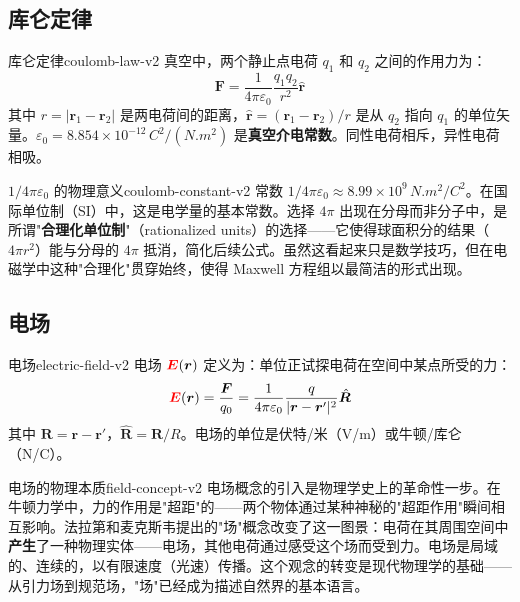 \documentclass[11pt,a4paper,openany,oneside]{book}
\newcommand{\vecE}{\textcolor{red}{\vect{E}}}
\newcommand{\eps}{\varepsilon}
\newcommand{\vect}[1]{\bm{#1}}
\newcommand{\unitvec}[1]{\hat{\vect{#1}}}
\begin{document}
\subsection{库仑定律}

\begin{theorem}{库仑定律}{coulomb-law-v2}
真空中，两个静止点电荷 $q_1$ 和 $q_2$ 之间的作用力为：
\[
\vect{F} = \frac{1}{4\pi\eps_0} \frac{q_1 q_2}{r^2} \unitvec{r}
\]
其中 $r = |\vect{r}_1 - \vect{r}_2|$ 是两电荷间的距离，$\unitvec{r} = (\vect{r}_1 - \vect{r}_2)/r$ 是从 $q_2$ 指向 $q_1$ 的单位矢量。$\eps_0 = 8.854 \times 10^{-12} \, \si{C^2/(N.m^2)}$ 是\textbf{真空介电常数}。同性电荷相斥，异性电荷相吸。
\end{theorem}

\begin{insight}{$1/4\pi\eps_0$ 的物理意义}{coulomb-constant-v2}
常数 $1/4\pi\eps_0 \approx 8.99 \times 10^9 \, \si{N.m^2/C^2}$。在国际单位制（SI）中，这是电学量的基本常数。选择 $4\pi$ 出现在分母而非分子中，是所谓"\textbf{合理化单位制}"（rationalized units）的选择——它使得球面积分的结果（$4\pi r^2$）能与分母的 $4\pi$ 抵消，简化后续公式。虽然这看起来只是数学技巧，但在电磁学中这种"合理化"贯穿始终，使得 Maxwell 方程组以最简洁的形式出现。
\end{insight}

\subsection{电场}

\begin{definition}{电场}{electric-field-v2}
电场 $\vecE(\vect{r})$ 定义为：单位正试探电荷在空间中某点所受的力：
\[
\vecE(\vect{r}) = \frac{\vect{F}}{q_0} = \frac{1}{4\pi\eps_0} \frac{q}{|\vect{r} - \vect{r}'|^2} \unitvec{R}
\]
其中 $\vect{R} = \vect{r} - \vect{r}'$，$\unitvec{R} = \vect{R}/R$。电场的单位是伏特/米（V/m）或牛顿/库仑（N/C）。
\end{definition}

\begin{insight}{电场的物理本质}{field-concept-v2}
电场概念的引入是物理学史上的革命性一步。在牛顿力学中，力的作用是"超距"的——两个物体通过某种神秘的"超距作用"瞬间相互影响。法拉第和麦克斯韦提出的"场"概念改变了这一图景：电荷在其周围空间中\textbf{产生}了一种物理实体——电场，其他电荷通过感受这个场而受到力。电场是局域的、连续的，以有限速度（光速）传播。这个观念的转变是现代物理学的基础——从引力场到规范场，"场"已经成为描述自然界的基本语言。
\end{insight}
\end{document}
